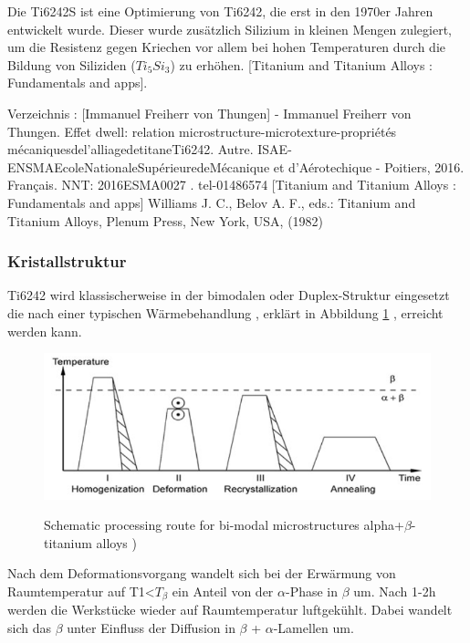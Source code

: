 Die Ti6242S ist eine Optimierung von Ti6242, die erst in den 1970er Jahren  entwickelt wurde. Dieser wurde zusätzlich Silizium in kleinen Mengen zulegiert, um die Resistenz gegen Kriechen vor allem bei hohen Temperaturen durch die Bildung von Siliziden ($Ti_5Si_3$) zu erhöhen.  [Titanium and Titanium Alloys : Fundamentals and apps]. 

Verzeichnis : [Immanuel Freiherr von Thungen] - Immanuel Freiherr von Thungen. Effet dwell: relation microstructure-microtexture-propriétés mécaniquesdel’alliagedetitaneTi6242. Autre. ISAE-ENSMAEcoleNationaleSupérieuredeMécanique et d’Aérotechique - Poitiers, 2016. Français. NNT: 2016ESMA0027 .  tel-01486574
[Titanium and Titanium Alloys : Fundamentals and apps] Williams J. C., Belov A. F., eds.: Titanium and Titanium Alloys, Plenum Press, New York, USA, (1982) 


\subsubsection{Kristallstruktur}

Ti6242 wird klassischerweise in der bimodalen oder Duplex-Struktur eingesetzt die nach einer typischen Wärmebehandlung , erklärt in Abbildung \ref{WB} , erreicht  werden kann.

\begin{figure}[H]
	
	\centering
	
	{\includegraphics[width=1\textwidth]{Bilder/WB}}			
	\caption{Schematic processing route for bi-modal microstructures alpha+$\beta$-titanium alloys )}
	\label{WB}
\end{figure}
Nach dem Deformationsvorgang wandelt sich bei der Erwärmung von Raumtemperatur  auf \hspace{1ex} T1<$T_{\beta}$  ein Anteil von der $\alpha$-Phase in $\beta$ um. Nach 1-2h werden die Werkstücke wieder auf Raumtemperatur luftgekühlt.
Dabei wandelt sich das $\beta$ unter Einfluss der Diffusion in $\beta$ + $\alpha$-Lamellen um.

